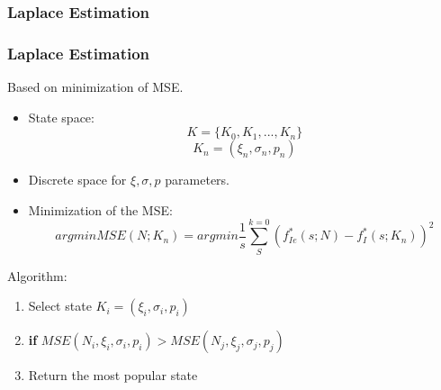 \documentclass[9pt,handout,serif]{beamer}
\begin{document}
\subsubsection*{Laplace Estimation}
\begin{frame}[c]
	\frametitle{Laplace Estimation}
	Based on minimization of MSE.\\
	\begin{itemize}
		\item State space:
		\begin{equation}
			K = \{K_0, K_1, ..., K_n\}
		\end{equation}
		\begin{equation}
			K_n = (\xi_n, \sigma_n, p_n)
		\end{equation}
		\item Discrete space for $\xi, \sigma, p$ parameters.
		\item Minimization of the MSE:
		\begin{equation}
			arg min MSE(N; K_n) = arg min \frac{1}{s}\sum_{S}^{k=0}(f_{Ie}^{*}(s;N)-f_I^{*}(s;K_n))^2
		\end{equation}
	\end{itemize}
	Algorithm:
	\begin{enumerate}
		\item Select state $K_i = (\xi_i, \sigma_i, p_i)$
		\item \textbf{if} $MSE(N_i, \xi_i, \sigma_i, p_i) > MSE(N_j, \xi_j, \sigma_j, p_j)$
		\item Return the most popular state
	\end{enumerate}
\end{frame}
\end{document}
